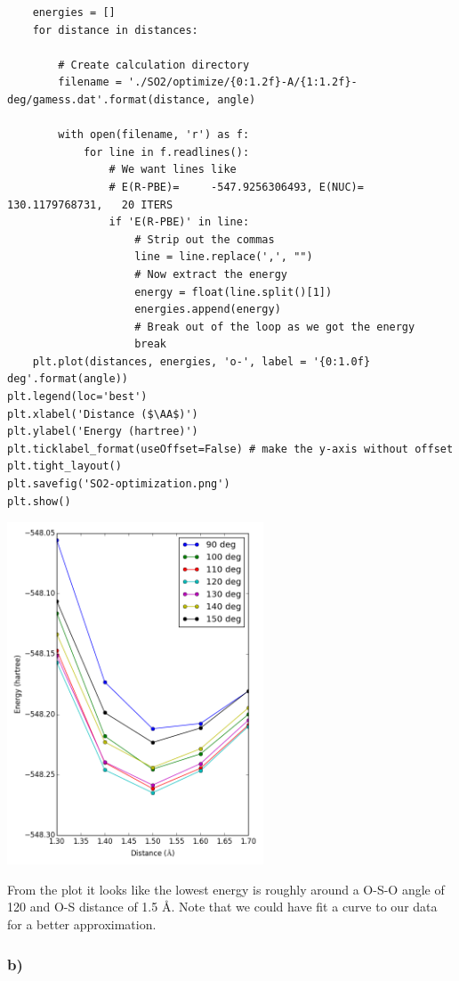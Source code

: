 \documentclass[11pt]{article}
\begin{document}
\begin{enumerate}
\begin{verbatim}
    energies = []
    for distance in distances:
        
        # Create calculation directory
        filename = './SO2/optimize/{0:1.2f}-A/{1:1.2f}-deg/gamess.dat'.format(distance, angle)

        with open(filename, 'r') as f:
            for line in f.readlines():
                # We want lines like
                # E(R-PBE)=     -547.9256306493, E(NUC)=  130.1179768731,   20 ITERS
                if 'E(R-PBE)' in line:
                    # Strip out the commas
                    line = line.replace(',', "")
                    # Now extract the energy
                    energy = float(line.split()[1])
                    energies.append(energy)
                    # Break out of the loop as we got the energy
                    break
    plt.plot(distances, energies, 'o-', label = '{0:1.0f} deg'.format(angle))
plt.legend(loc='best')
plt.xlabel('Distance ($\AA$)')
plt.ylabel('Energy (hartree)')
plt.ticklabel_format(useOffset=False) # make the y-axis without offset
plt.tight_layout()
plt.savefig('SO2-optimization.png')
plt.show()
\end{verbatim}

\includegraphics[width=3in]{./SO2-optimization.png}

From the plot it looks like the lowest energy is roughly around a O-S-O angle of 120\textdegree{} and O-S distance of 1.5 \AA{}. Note that we could have fit a curve to our data for a better approximation.
\end{enumerate}


\subsubsection{b)}
\label{sec-3-1-2}
\end{document}
